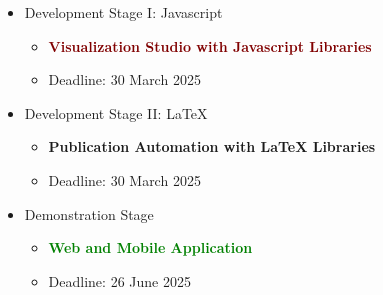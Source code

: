\documentclass{ammTalk}
\begin{document}
\begin{itemize}[itemsep=6mm]\LARGE
 \item Development Stage I: Javascript
       \begin{itemize}\large
        \item \textbf{\textcolor{Maroon}{Visualization Studio with Javascript Libraries}}
        \item Deadline: 30 March 2025
       \end{itemize}

\item Development Stage II: LaTeX
       \begin{itemize}\large
        \item \textbf{\textcolor{RoyalBlue!80!cyan}{Publication Automation with LaTeX Libraries}}
        \item Deadline: 30 March 2025
       \end{itemize}

 \item  Demonstration Stage
       \begin{itemize}\large
        \item \textbf{\textcolor{Green}{Web and Mobile Application}}
        \item Deadline: 26 June 2025
       \end{itemize}
\end{itemize}
\end{document}

